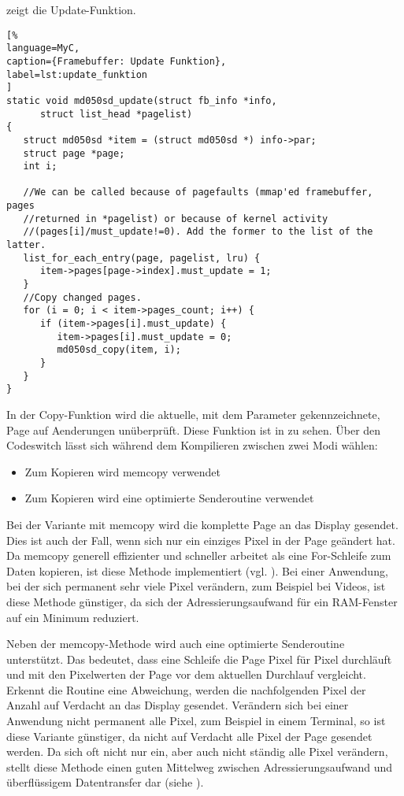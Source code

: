  zeigt die Update-Funktion.
\begin{lstlisting}[%
language=MyC,
caption={Framebuffer: Update Funktion},
label=lst:update_funktion
]
static void md050sd_update(struct fb_info *info,
      struct list_head *pagelist)
{
   struct md050sd *item = (struct md050sd *) info->par;
   struct page *page;
   int i;

   //We can be called because of pagefaults (mmap'ed framebuffer, pages
   //returned in *pagelist) or because of kernel activity
   //(pages[i]/must_update!=0). Add the former to the list of the latter.
   list_for_each_entry(page, pagelist, lru) {
      item->pages[page->index].must_update = 1;
   }
   //Copy changed pages.
   for (i = 0; i < item->pages_count; i++) {
      if (item->pages[i].must_update) {
         item->pages[i].must_update = 0;
         md050sd_copy(item, i);
      }
   }
}
\end{lstlisting}
In der Copy-Funktion wird die aktuelle, mit dem Parameter  gekennzeichnete, Page auf Aenderungen unüberprüft. Diese Funktion ist in  zu sehen. Über den Codeswitch  lässt sich während dem Kompilieren zwischen zwei Modi wählen:
\begin{itemize}
	\item Zum Kopieren wird memcopy verwendet
	\item Zum Kopieren wird eine optimierte Senderoutine verwendet
\end{itemize}

Bei der Variante mit memcopy wird die komplette Page an das Display gesendet. Dies ist auch der Fall, wenn sich nur ein einziges Pixel in der Page geändert hat. Da memcopy generell effizienter und schneller arbeitet als eine For-Schleife zum Daten kopieren, ist diese Methode implementiert (vgl. \cite{Nadeau2012}). Bei einer Anwendung, bei der sich permanent sehr viele Pixel verändern, zum Beispiel bei Videos, ist diese Methode günstiger, da sich der Adressierungsaufwand für ein RAM-Fenster auf ein Minimum reduziert. 

Neben der memcopy-Methode wird auch eine optimierte Senderoutine unterstützt. Das bedeutet, dass eine Schleife die Page Pixel für Pixel durchläuft und mit den Pixelwerten der Page vor dem aktuellen Durchlauf vergleicht. Erkennt die Routine eine Abweichung, werden die nachfolgenden Pixel der Anzahl  auf Verdacht an das Display gesendet. Verändern sich bei einer Anwendung nicht permanent alle Pixel, zum Beispiel in einem Terminal, so ist diese Variante günstiger, da nicht auf Verdacht alle Pixel der Page gesendet werden.
Da sich oft nicht nur ein, aber auch nicht ständig alle Pixel  verändern, stellt diese Methode einen guten Mittelweg zwischen Adressierungsaufwand und überflüssigem Datentransfer dar (siehe \cite{Schlegel2013a}). 


